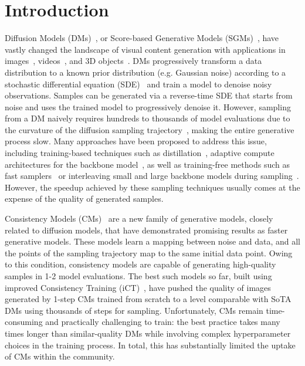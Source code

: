 \documentclass{article}
\begin{document}
\section{Introduction}
Diffusion Models (DMs)~\citep{ho2020denoising,ddim}, or Score-based Generative Models (SGMs)~\citep{song2020score,scoresde}, have vastly changed the landscape of visual content generation with applications in images~\citep{rombach2021high,saharia2022image,ho2022cascaded,dhariwal2021diffusion,hatamizadeh2023diffit,ramesh2021zero}, videos~\citep{videoworldsimulators2024,blattmann2023stable,bar2024lumiere,ho2022imagen,gupta2023photorealistic}, and 3D objects~\citep{poole2022dreamfusion,wang2024prolificdreamer,lee2024dreamflow,chen2024vp3d,babu2023hyperfields}. 
DMs progressively transform a data distribution to a known prior distribution (e.g. Gaussian noise) according to a stochastic differential equation (SDE)~\citep{scoresde} and train a model to denoise noisy observations. 
Samples can be generated via a reverse-time SDE that starts from noise and uses the trained model to progressively denoise it.
However, sampling from a DM naively requires hundreds to thousands of model evaluations due to the curvature of the diffusion sampling trajectory~\citep{Karras2022edm}, making the entire generative process slow. 
Many approaches have been proposed to address this issue,  
including training-based techniques such as  distillation~\citep{Luhman2021KnowledgeDI,salimans2022progressive,di,gu2023boot,sauer2023adversarial,geng2024one,yin2023one,nguyen2023swiftbrush}, adaptive compute architectures for the backbone model~\citep{moon2023early,tang2023deediff}, as well as training-free methods such as fast samplers~\citep{kong2021fast,lu2022dpm,zhang2022fast,zhou2023fast,xue2024sa} or interleaving small and large backbone models during sampling~\citep{pan2024t}.
However, the speedup achieved by these sampling techniques usually comes at the expense of the quality of generated samples.

Consistency Models (CMs)~\citep{cm} are a new family of generative models, closely related to diffusion models, that have demonstrated promising results as faster generative models. 
These models learn a mapping between noise and data, and all the points of the sampling trajectory map to the same initial data point.
Owing to this condition, consistency models are capable of generating high-quality samples in 1-2 model evaluations.
The best such models so far, built using improved Consistency Training (iCT)~\citep{ict}, have pushed the quality of images generated by 1-step CMs trained from scratch to a level comparable with SoTA DMs using thousands of steps for sampling.   
Unfortunately, CMs remain time-consuming and practically challenging to train: the best practice takes many times longer than similar-quality DMs while involving complex hyperparameter choices in the training process.  
In total, this has substantially limited the uptake of CMs within the community.
\end{document}
